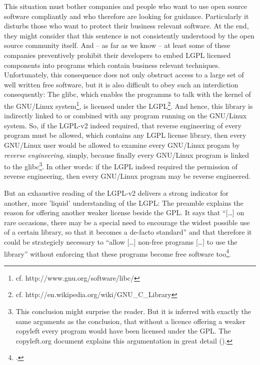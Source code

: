 This situation must bother companies and people who want to use open source
software compliantly and who therefore are looking for guidance. Particularly it
disturbs those who want to protect their business relevant software. At the end,
they might consider that this sentence is not consistently understood by the
open source community itself. And -- as far as we know -- at least some of these
companies preventively prohibit their developers to embed LGPL licensed
components into programs which contain business relevant techniques.
Unfortunately, this consequence does not only obstruct access to a large set of
well written free software, but it is also difficult to obey such an
interdiction consequently: The glibc, which enables the programms to talk with
the kernel of the GNU/Linux system\footnote{cf.
http://www.gnu.org/software/libc/}, is licensed under the LGPL\footnote{cf.
http://en.wikipedia.org/wiki/GNU\_C\_Library}. And hence, this library is
indirectly linked to or combined with any program running on the GNU/Linux
system. So, if the LGPL-v2 indeed required, that reverse engineering of every
program must be allowed, which contains any LGPL license library, then every
GNU/Linux user would be allowed to examine every GNU/Linux progam by
\emph{reverse engineering}, simply, because finally every GNU/Linux program is
linked to the glibc\footnote{This conclusion might surprise the reader. But it
is inferred with exactly the same arguments as the conclusion, that without a
licence offering a weaker copyleft every program would have been licensed under
the GPL. The copyleft.org document explains this argumentation in great detail
(\cite[cf.][56f]{KuhSebGin2014a}).}. In other words: if the LGPL indeed required
the permission of reverse engineering, then every GNU/Linux program may be
reverse engineered.

But an exhaustive reading of the LGPL-v2 delivers a strong indicator for
another, more 'liquid' understanding of the LGPL: The preamble explains the
reason for offering another weaker license beside the GPL. It says that
\enquote{[\ldots] on rare occasions, there may be a special need to encourage
the widest possible use of a certain library, so that it becomes a de-facto
standard} and that therefore it could be strategicly necessary to \enquote{allow
[\ldots] non-free programs [\ldots] to use the library} without enforcing that
these programs become free software too\footcite[cf.][\nopage wp,
§preamble]{Lgpl21OsiLicense1999a}.

